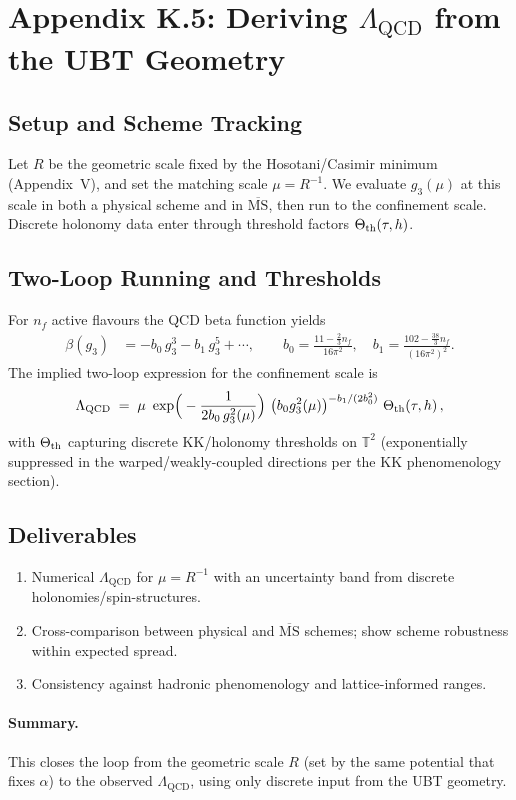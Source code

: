 \appendix
\section*{Appendix K.5: Deriving \texorpdfstring{$\Lambda_{\mathrm{QCD}}$}{Lambda\_QCD} from the UBT Geometry}

\subsection*{Setup and Scheme Tracking}
Let $R$ be the geometric scale fixed by the Hosotani/Casimir minimum (Appendix~V), and set the matching scale $\mu=R^{-1}$.
We evaluate $g_3(\mu)$ at this scale in both a physical scheme and in $\overline{\mathrm{MS}}$, then run to the confinement scale.
Discrete holonomy data enter through threshold factors $\Theta_{\rm th}(\tau,h)$.

\subsection*{Two-Loop Running and Thresholds}
For $n_f$ active flavours the QCD beta function yields
\begin{align}
  \beta(g_3) &= -b_0\,g_3^3 - b_1\,g_3^5 + \cdots,\qquad
  b_0=\frac{11-\tfrac{2}{3}n_f}{16\pi^2},\quad
  b_1=\frac{102-\tfrac{38}{3}n_f}{(16\pi^2)^2}.
\end{align}
The implied two-loop expression for the confinement scale is
\begin{equation}
  \Lambda_{\mathrm{QCD}} \;=\; \mu\ \exp\!\Big(-\frac{1}{2b_0\,g_3^2(\mu)}\Big)\ \big(b_0 g_3^2(\mu)\big)^{-b_1/(2b_0^2)}\ \Theta_{\rm th}(\tau,h)\,,
\end{equation}
with $\Theta_{\rm th}$ capturing discrete KK/holonomy thresholds on $\mathbb{T}^2$ (exponentially suppressed in the warped/weakly-coupled directions per the KK phenomenology section).

\subsection*{Deliverables}
\begin{enumerate}
  \item Numerical $\Lambda_{\mathrm{QCD}}$ for $\mu=R^{-1}$ with an uncertainty band from discrete holonomies/spin-structures.
  \item Cross-comparison between physical and $\overline{\mathrm{MS}}$ schemes; show scheme robustness within expected spread.
  \item Consistency against hadronic phenomenology and lattice-informed ranges.
\end{enumerate}

\paragraph{Summary.}
This closes the loop from the geometric scale $R$ (set by the same potential that fixes $\alpha$) to the observed $\Lambda_{\mathrm{QCD}}$,
using only discrete input from the UBT geometry.
